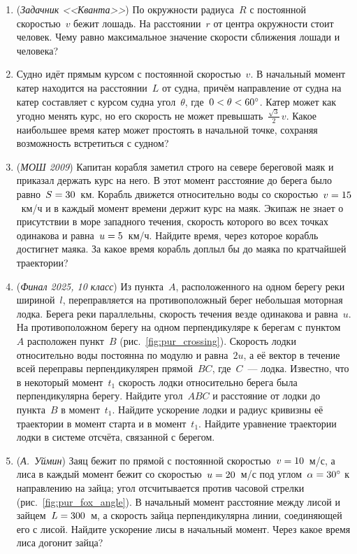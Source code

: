 \documentclass[../main.tex]{subfiles}
\begin{document}
\begin{enumerate}[wide=0pt]

  \item (\textit{Задачник <<Кванта>>}) По окружности радиуса~$R$ с постоянной скоростью~$v$ бежит лошадь. На расстоянии~$r$ от центра окружности стоит человек. Чему равно
  максимальное значение скорости сближения лошади и человека?

  \item Судно идёт прямым курсом с постоянной скоростью~$v$. В начальный момент катер
  находится на расстоянии~$L$ от судна, причём направление от судна на катер
  составляет с курсом судна угол~$\theta$, где~$0 <\nobreak \theta <\nobreak 60^\circ$.
  Катер может как угодно менять курс, но его скорость не может
  превышать~$\frac{\sqrt{3}}{2}\,v$. Какое наибольшее время катер может простоять в
  начальной точке, сохраняя возможность встретиться с судном?

  \item (\textit{МОШ 2009}) Капитан корабля заметил строго на севере береговой маяк и
  приказал держать курс на него. В этот момент расстояние до берега было равно~$S \hm= 30$~км. Корабль движется относительно воды со скоростью~$v \hm= 15$~км/ч и в каждый
  момент времени держит курс на маяк. Экипаж не знает о присутствии в море западного
  течения, скорость которого во всех точках одинакова и равна~$u \hm= 5$~км/ч. Найдите
  время, через которое корабль достигнет маяка. За какое время корабль доплыл бы до
  маяка по кратчайшей траектории?

  \item (\textit{Финал 2025, 10 класс}) Из пункта~$A$, расположенного на одном
  берегу реки шириной~$l$, переправляется на противоположный берег небольшая моторная
  лодка. Берега реки параллельны, скорость течения везде одинакова и равна~$u$. На
  противоположном берегу на одном перпендикуляре к берегам с пунктом~$A$ расположен
  пункт~$B$ (рис.~\ref{fig:pur_crossing}). Скорость лодки относительно воды постоянна
  по модулю и равна~$2u$, а её вектор в течение всей переправы перпендикулярен прямой~$BC$, где~$C$~--- лодка. Известно, что в некоторый момент~$t_1$ скорость лодки
  относительно берега была перпендикулярна берегу. Найдите угол~$ABC$ и расстояние от
  лодки до пункта~$B$ в момент~$t_1$. Найдите ускорение лодки и радиус кривизны её
  траектории в момент старта и в момент~$t_1$. Найдите уравнение траектории лодки в
  системе отсчёта, связанной с берегом.

  \item (\textit{А.~Уймин}) Заяц бежит по прямой с постоянной скоростью~$v \hm= 10$~м/с, а
  лиса в каждый момент бежит со скоростью~$u \hm= 20$~м/с под углом~$\alpha \hm= 30^\circ$ к
  направлению на зайца; угол отсчитывается против часовой стрелки
  (рис.~\ref{fig:pur_fox_angle}). В начальный момент расстояние между лисой и зайцем~$L \hm= 300$~м, а скорость зайца перпендикулярна линии, соединяющей его с лисой.
  Найдите ускорение лисы в начальный момент. Через какое время лиса догонит зайца?


\end{enumerate}
\end{document}
